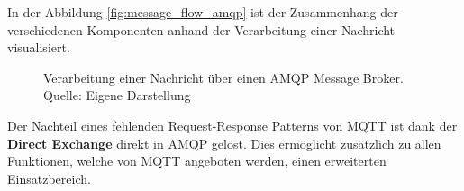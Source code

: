 In der Abbildung \vref{fig:message_flow_amqp} ist der Zusammenhang der verschiedenen Komponenten anhand der Verarbeitung einer Nachricht visualisiert.

\begin{figure}
    \centering
    \caption{Verarbeitung einer Nachricht über einen \ac{AMQP} Message Broker.\\Quelle: Eigene Darstellung}
    \label{fig:message_flow_amqp}
\end{figure}

Der Nachteil eines fehlenden Request-Response Patterns von \ac{MQTT} ist dank der \textbf{Direct Exchange} direkt in \ac{AMQP} gelöst. Dies ermöglicht zusätzlich zu allen Funktionen, welche von \ac{MQTT} angeboten werden, einen erweiterten Einsatzbereich.



